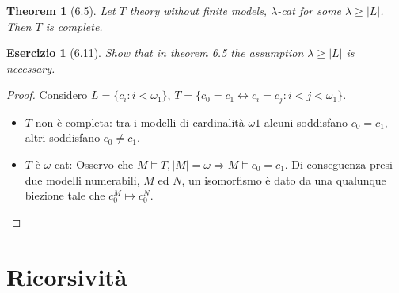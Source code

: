 \documentclass{book}
\newtheorem*{theorem}{Theorem}
\newtheorem*{esercizio}{Esercizio}
\begin{document}
\begin{theorem}[6.5]
    Let $T$ theory without finite models, $\lambda$-cat for some $\lambda \geq |L|$. Then $T$ is complete. 
\end{theorem}

\begin{esercizio}[6.11]
    Show that in theorem 6.5 the assumption $\lambda \geq |L|$ is necessary.    
\end{esercizio}

\begin{proof}
    Considero $L = \{c_i : i<\omega_1\}$, $T = \{c_0 = c_1 \leftrightarrow c_i = c_j : i < j < \omega_1\}$. \begin{itemize}
        \item $T$ non è completa: tra i modelli di cardinalità $\omega1$ alcuni soddisfano $c_0 = c_1$, altri soddisfano $c_0 \not = c_1$.

        \item $T$ è $\omega$-cat: Osservo che $M \models T, |M| = \omega \Rightarrow M \models c_0 = c_1$. Di conseguenza presi due modelli numerabili, $M$ ed $N$, un isomorfismo è dato da una qualunque biezione tale che $c_0^M \mapsto c_0^N$.
    \end{itemize}
\end{proof}





\chapter{Ricorsività}
\end{document}
